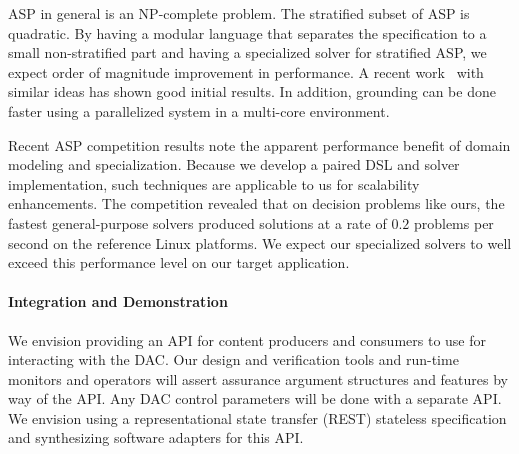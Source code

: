 
ASP in general is an NP-complete problem. The stratified subset of ASP is quadratic. By having a modular language that separates the specification to a small non-stratified part and having a specialized solver for stratified ASP, we expect order of magnitude improvement in performance.  A recent work~\cite{cuteri} with similar ideas has shown good initial results. In addition, grounding can be done faster using a parallelized system in a multi-core environment.

Recent ASP competition results \cite{ASPC6} note the apparent performance benefit of domain modeling and specialization.  %
Because we develop a paired DSL and solver implementation, such techniques are applicable to us for scalability enhancements.  The competition revealed that on decision problems like ours, the fastest general-purpose solvers produced solutions at a rate of $0.2$ problems per second on the reference Linux platforms.  We expect our specialized solvers to well exceed this performance level on our target application.


\paragraph{Integration and Demonstration}

We envision providing an API for content producers and consumers to use for interacting with the DAC.  Our design and verification tools and run-time monitors and operators will assert assurance argument structures and features by way of the API.  Any DAC control parameters will be done with a separate API.  We envision using a representational state transfer (REST) stateless specification and synthesizing software adapters for this API.  

